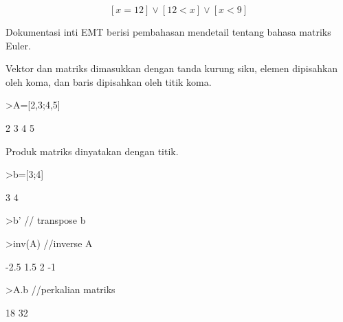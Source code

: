 \documentclass[a4paper,10pt]{article}
\begin{document}
\begin{eulernotebook}
\begin{eulercomment}
\begin{eulercomment}
\begin{eulercomment}
\begin{eulercomment}
\begin{eulercomment}
\begin{eulercomment}
\begin{eulercomment}
\begin{eulercomment}
\begin{eulercomment}
\begin{eulercomment}
\begin{eulercomment}
\begin{eulercomment}
\begin{eulercomment}
\begin{eulercomment}
\begin{euleroutput}
\end{euleroutput}
\begin{eulerformula}
\[
\left[ x=12 \right] \lor \left[ 12<x \right] \lor \left[ x<9
  \right] 
\]
\end{eulerformula}
\begin{eulercomment}
\begin{eulercomment}
\begin{eulercomment}
Dokumentasi inti EMT berisi pembahasan mendetail tentang bahasa
matriks Euler.

Vektor dan matriks dimasukkan dengan tanda kurung siku, elemen
dipisahkan oleh koma, dan baris dipisahkan oleh titik koma.
\end{eulercomment}
\begin{eulerprompt}
>A=[2,3;4,5]
\end{eulerprompt}
\begin{euleroutput}
              2             3 
              4             5 
\end{euleroutput}
\begin{eulercomment}
Produk matriks dinyatakan dengan titik.
\end{eulercomment}
\begin{eulerprompt}
>b=[3;4]
\end{eulerprompt}
\begin{euleroutput}
              3 
              4 
\end{euleroutput}
\begin{eulerprompt}
>b' // transpose b
\end{eulerprompt}
\begin{euleroutput}
  [3,  4]
\end{euleroutput}
\begin{eulerprompt}
>inv(A) //inverse A
\end{eulerprompt}
\begin{euleroutput}
           -2.5           1.5 
              2            -1 
\end{euleroutput}
\begin{eulerprompt}
>A.b //perkalian matriks
\end{eulerprompt}
\begin{euleroutput}
             18 
             32 
\end{euleroutput}
\begin{eulerprompt}

\end{eulerprompt}
\end{eulercomment}
\end{eulercomment}
\end{eulercomment}
\end{eulercomment}
\end{eulercomment}
\end{eulercomment}
\end{eulercomment}
\end{eulercomment}
\end{eulercomment}
\end{eulercomment}
\end{eulercomment}
\end{eulercomment}
\end{eulercomment}
\end{eulercomment}
\end{eulercomment}
\end{eulercomment}
\end{eulernotebook}
\end{document}
